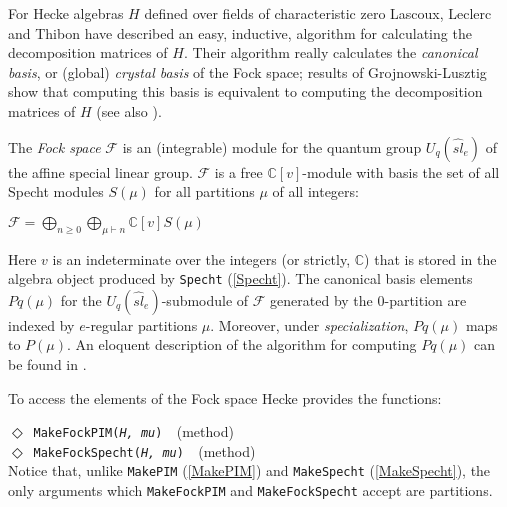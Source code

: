 \documentclass[a4paper,11pt]{report}
\begin{document}
{{{ For Hecke algebras $H$ defined over fields of characteristic zero Lascoux, Leclerc and Thibon \cite{LLT} have described an easy, inductive, algorithm for calculating the decomposition
matrices of $H$. Their algorithm really calculates the \emph{canonical basis}, or (global) \emph{crystal basis} of the Fock space; results of Grojnowski-Lusztig \cite{Gr} show that computing this basis is equivalent to computing the decomposition
matrices of $H$ (see also \cite{A}).

 The \emph{Fock space} $\mathcal{F} $ is an (integrable) module for the quantum group $U_q(\widehat{sl} _{e})$ of the affine special linear group. $\mathcal{F} $ is a free ${\ensuremath{\mathbb C}}[v]$-module with basis the set of all Specht modules $S(\mu)$ for all partitions $\mu$ of all integers:

 $\mathcal{F}= \bigoplus_{n\geq0}\bigoplus_{\mu\vdash n}\mathbb{C}[v]S(\mu)$

 Here $v$ is an indeterminate over the integers (or strictly, ${\ensuremath{\mathbb C}}$) that is stored in the algebra object produced by \texttt{Specht} (\ref{Specht}). The canonical basis elements $Pq(\mu)$ for the $U_q( \widehat{sl}_e)$-submodule of $\mathcal{F} $ generated by the $0$-partition are indexed by $e$-regular partitions $\mu$. Moreover, under \emph{specialization}, $Pq(\mu)$ maps to $P(\mu)$. An eloquent description of the algorithm for computing $Pq(\mu)$ can be found in \cite{LLT}.

 To access the elements of the Fock space \textsf{Hecke} provides the functions:

 \noindent\textcolor{FuncColor}{$\Diamond$\ \texttt{MakeFockPIM({\slshape H, mu})
\label{MakeFockPIM}
}\hfill{\scriptsize (method)}}\\
\noindent\textcolor{FuncColor}{$\Diamond$\ \texttt{MakeFockSpecht({\slshape H, mu})
\label{MakeFockSpecht}
}\hfill{\scriptsize (method)}}\\


 Notice that, unlike \texttt{MakePIM} (\ref{MakePIM}) and \texttt{MakeSpecht} (\ref{MakeSpecht}), the only arguments which \texttt{MakeFockPIM} and \texttt{MakeFockSpecht} accept are partitions.

}}}
\end{document}
